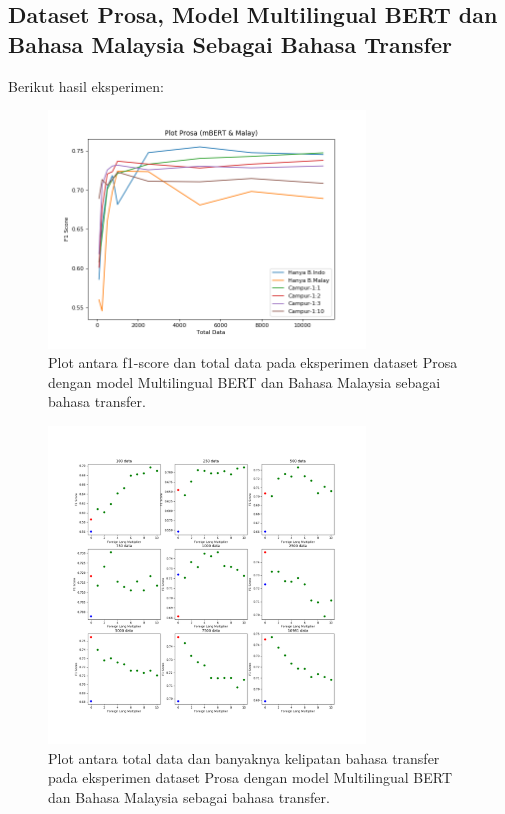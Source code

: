     \subsection{Dataset Prosa, Model Multilingual BERT dan Bahasa Malaysia Sebagai Bahasa Transfer}

        Berikut hasil eksperimen: 
        \begin{figure}[ht]
            \centering
            \includegraphics[width=0.75\textwidth]{resources/prosa-mbert-malay-1.png}
            \caption{Plot antara f1-score dan total data pada eksperimen dataset Prosa dengan model Multilingual BERT dan Bahasa Malaysia sebagai bahasa transfer.}

            \label{fig:prosa_mbert_malay_1}
        \end{figure}

        \begin{figure}[ht]
            \centering
            \includegraphics[width=0.75\textwidth]{resources/prosa-mbert-malay-2.png}
            \caption{Plot antara total data dan banyaknya kelipatan bahasa transfer pada eksperimen dataset Prosa dengan model Multilingual BERT dan Bahasa Malaysia sebagai bahasa transfer.}

            \label{fig:prosa_mbert_malay_2}
        \end{figure}
